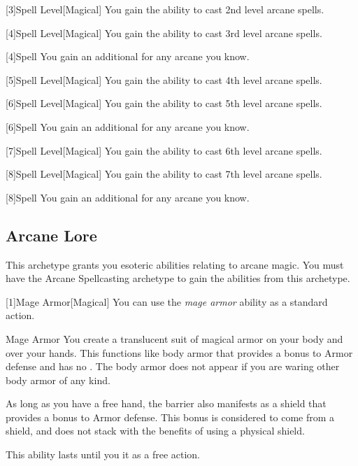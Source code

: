         [3]{Spell Level}[Magical] You gain the ability to cast 2nd level arcane spells.

        [4]{Spell Level}[Magical] You gain the ability to cast 3rd level arcane spells.

        [4]{Spell} You gain an additional  for any arcane  you know.

        [5]{Spell Level}[Magical] You gain the ability to cast 4th level arcane spells.

        [6]{Spell Level}[Magical] You gain the ability to cast 5th level arcane spells.

        [6]{Spell} You gain an additional  for any arcane  you know.

        [7]{Spell Level}[Magical] You gain the ability to cast 6th level arcane spells.

        [8]{Spell Level}[Magical] You gain the ability to cast 7th level arcane spells.

        [8]{Spell} You gain an additional  for any arcane  you know.

    \subsection{Arcane Lore}
        This archetype grants you esoteric abilities relating to arcane magic.
        You must have the Arcane Spellcasting archetype to gain the abilities from this archetype.

        [1]{Mage Armor}[Magical] You can use the \textit{mage armor} ability as a standard action.
        \begin{freeability}{Mage Armor}
            You create a translucent suit of magical armor on your body and over your hands.
            This functions like body armor that provides a  bonus to Armor defense and has no .
            The body armor does not appear if you are waring other body armor of any kind.

            As long as you have a free hand, the barrier also manifests as a shield that provides a  bonus to Armor defense.
            This bonus is considered to come from a shield, and does not stack with the benefits of using a physical shield.

            This ability lasts until you  it as a free action.
        \end{freeability}

